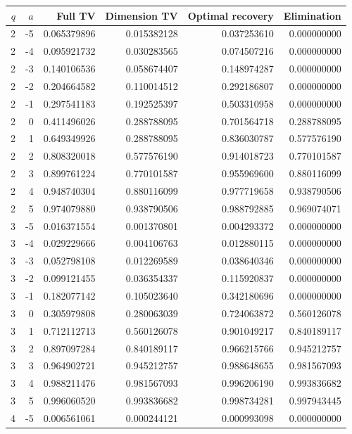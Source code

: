 \begin{tabular}{rrrrrr}
\toprule
$q$ & $a$ & Full TV & Dimension TV & Optimal recovery & Elimination \\
\midrule
2 & -5 & 0.065379896 & 0.015382128 & 0.037253610 & 0.000000000 \\
2 & -4 & 0.095921732 & 0.030283565 & 0.074507216 & 0.000000000 \\
2 & -3 & 0.140106536 & 0.058674407 & 0.148974287 & 0.000000000 \\
2 & -2 & 0.204664582 & 0.110014512 & 0.292186807 & 0.000000000 \\
2 & -1 & 0.297541183 & 0.192525397 & 0.503310958 & 0.000000000 \\
2 & 0 & 0.411496026 & 0.288788095 & 0.701564718 & 0.288788095 \\
2 & 1 & 0.649349926 & 0.288788095 & 0.836030787 & 0.577576190 \\
2 & 2 & 0.808320018 & 0.577576190 & 0.914018723 & 0.770101587 \\
2 & 3 & 0.899761224 & 0.770101587 & 0.955969600 & 0.880116099 \\
2 & 4 & 0.948740304 & 0.880116099 & 0.977719658 & 0.938790506 \\
2 & 5 & 0.974079880 & 0.938790506 & 0.988792885 & 0.969074071 \\
3 & -5 & 0.016371554 & 0.001370801 & 0.004293372 & 0.000000000 \\
3 & -4 & 0.029229666 & 0.004106763 & 0.012880115 & 0.000000000 \\
3 & -3 & 0.052798108 & 0.012269589 & 0.038640346 & 0.000000000 \\
3 & -2 & 0.099121455 & 0.036354337 & 0.115920837 & 0.000000000 \\
3 & -1 & 0.182077142 & 0.105023640 & 0.342180696 & 0.000000000 \\
3 & 0 & 0.305979808 & 0.280063039 & 0.724063872 & 0.560126078 \\
3 & 1 & 0.712112713 & 0.560126078 & 0.901049217 & 0.840189117 \\
3 & 2 & 0.897097284 & 0.840189117 & 0.966215766 & 0.945212757 \\
3 & 3 & 0.964902721 & 0.945212757 & 0.988648655 & 0.981567093 \\
3 & 4 & 0.988211476 & 0.981567093 & 0.996206190 & 0.993836682 \\
3 & 5 & 0.996060520 & 0.993836682 & 0.998734281 & 0.997943445 \\
4 & -5 & 0.006561061 & 0.000244121 & 0.000993098 & 0.000000000 \\

\end{tabular}
